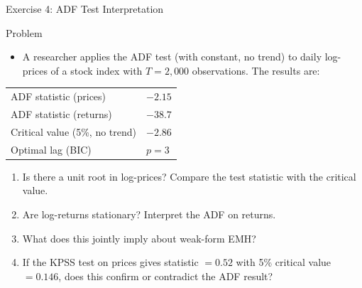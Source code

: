 \documentclass[9pt, aspectratio=169, t]{beamer}
\theoremstyle{definition}
\begin{document}
\begin{frame}{Exercise 4: ADF Test Interpretation}
\begin{block}{Problem}
\begin{itemize}
\item A researcher applies the ADF test (with constant, no trend) to daily log-prices of a stock index with $T = 2{,}000$ observations. The results are:
\end{itemize}
\begin{center}
{\small
\renewcommand{\arraystretch}{1.2}
\begin{tabular}{ll}
\toprule
ADF statistic (prices) & $-2.15$ \\
ADF statistic (returns) & $-38.7$ \\
Critical value (5\%, no trend) & $-2.86$ \\
Optimal lag (BIC) & $p = 3$ \\
\bottomrule
\end{tabular}
}
\end{center}
\end{block}
\begin{enumerate}
    \item Is there a unit root in log-prices? Compare the test statistic with the critical value.
    \item Are log-returns stationary? Interpret the ADF on returns.
    \item What does this jointly imply about weak-form EMH?
    \item If the KPSS test on prices gives statistic $= 0.52$ with 5\% critical value $= 0.146$, does this confirm or contradict the ADF result?
\end{enumerate}
\end{frame}
\end{document}
